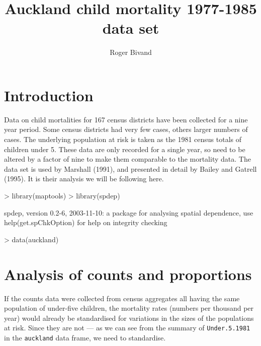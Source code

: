 \documentclass[a4paper,10pt]{article}
\title{Auckland child mortality 1977-1985 data set}
\author{Roger Bivand}
\newcommand{\code}[1]{\texttt{\small #1}}
\begin{document}
 

\maketitle 




\section{Introduction}

Data on child mortalities for 167 census districts have been collected for a nine year period. Some census districts had very few cases, others larger numbers of cases. The underlying population at risk is taken as the 1981 census totals of children under 5. These data are only recorded for a single year, so need to be altered by a factor of nine to make them comparable to the mortality data. The data set is used by Marshall (1991), and presented in detail by Bailey and Gatrell (1995). It is their analysis we will be following here.

\begin{footnotesize}
\begin{Schunk}
\begin{Sinput}
> library(maptools)
> library(spdep)
\end{Sinput}
\begin{Soutput}
spdep, version 0.2-6, 2003-11-10:
 a package for analysing spatial dependence,
 use help(get.spChkOption) for help on integrity checking
\end{Soutput}
\begin{Sinput}
> data(auckland)
\end{Sinput}
\end{Schunk}
\end{footnotesize}

\section{Analysis of counts and proportions}

If the counts data were collected from census aggregates all having the same population of under-five children, the mortality rates (numbers per thousand per year) would already be standardised for variations in the sizes of the populations at risk. Since they are not --- as we can see from the summary of \code{Under.5.1981} in the \code{auckland} data frame, we need to standardise.
\end{document}
